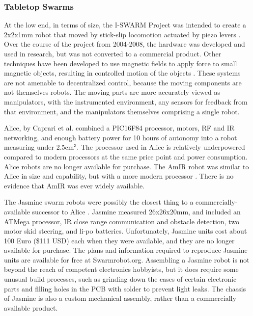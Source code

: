 \documentclass[]{article}
\begin{document}
\subsubsection{Tabletop Swarms}

At the low end, in terms of size, the I-SWARM Project was intended to create a 2x2x1mm robot that moved by stick-slip locomotion actuated by piezo levers \cite{seyfried2005swarm}. 
Over the course of the project from 2004-2008, the hardware was developed and used in research, but was not converted to a commercial product.
Other techniques have been developed to use magnetic fields to apply force to small magnetic objects, resulting in controlled motion of the objects \cite{floyd2008untethered, pelrine2012diamagnetically}.
These systems are not amenable to decentralized control, because the moving components are not themselves robots. 
The moving parts are more accurately viewed as manipulators, with the instrumented environment, any sensors for feedback from that environment, and the manipulators themselves comprising a single robot. 

Alice, by Caprari et al. \cite{caprari1998autonomous} combined a PIC16F84 processor, motors, RF and IR networking, and enough battery power for 10 hours of autonomy into a robot measuring under 2.5cm$^3$. 
The processor used in Alice is relatively underpowered compared to modern processors at the same price point and power consumption. 
Alice robots are no longer available for purchase. 
The AmIR robot was similar to Alice in size and capability, but with a more modern processor \cite{arvin2009development}.
There is no evidence that AmIR was ever widely available.

The Jasmine swarm robots were possibly the closest thing to a commercially-available successor to Alice  \cite{kernbach2011swarmrobot}.
Jasmine measured 26x26x20mm, and included an ATMega processor, IR close range communication and obstacle detection, two motor skid steering, and li-po batteries.
Unfortunately, Jasmine units cost about 100 Euro (\$111 USD) each when they were available, and they are no longer available for purchase. 
The plans and information required to reproduce Jasmine units are available for free at Swarmrobot.org.
Assembling a Jasmine robot is not beyond the reach of competent electronics hobbyists, but it does require some unusual build processes, such as grinding down the cases of certain electronic parts and filling holes in the PCB with solder to prevent light leaks. 
The chassis of Jasmine is also a custom mechanical assembly, rather than a commercially available product. 
\end{document}
